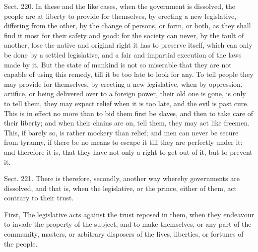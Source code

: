 \documentclass[11pt,openany]{book}
\begin{document}
Sect. 220. In these and the like cases, when the government is dissolved, the people are at liberty to provide for themselves, by erecting a new legislative, differing from the other, by the change of persons, or form, or both, as they shall find it most for their safety and good: for the society can never, by the fault of another, lose the native and original right it has to preserve itself, which can only be done by a settled legislative, and a fair and impartial execution of the laws made by it. But the state of mankind is not so miserable that they are not capable of using this remedy, till it be too late to look for any. To tell people they may provide for themselves, by erecting a new legislative, when by oppression, artifice, or being delivered over to a foreign power, their old one is gone, is only to tell them, they may expect relief when it is too late, and the evil is past cure. This is in effect no more than to bid them first be slaves, and then to take care of their liberty; and when their chains are on, tell them, they may act like freemen. This, if barely so, is rather mockery than relief; and men can never be secure from tyranny, if there be no means to escape it till they are perfectly under it: and therefore it is, that they have not only a right to get out of it, but to prevent it.

Sect. 221. There is therefore, secondly, another way whereby governments are dissolved, and that is, when the legislative, or the prince, either of them, act contrary to their trust.

First, The legislative acts against the trust reposed in them, when they endeavour to invade the property of the subject, and to make themselves, or any part of the community, masters, or arbitrary disposers of the lives, liberties, or fortunes of the people.
\end{document}
